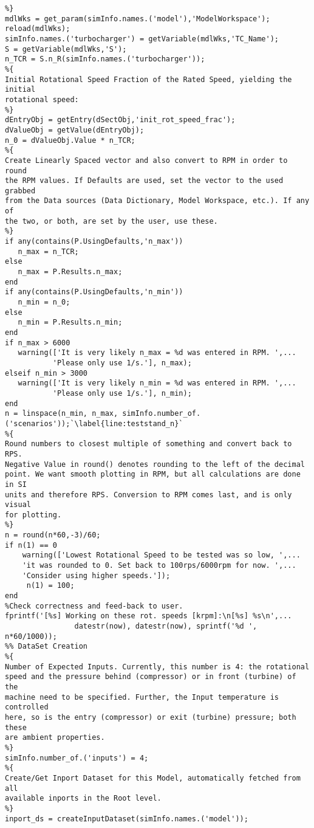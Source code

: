 \begin{lstlisting}
%}
mdlWks = get_param(simInfo.names.('model'),'ModelWorkspace');
reload(mdlWks);
simInfo.names.('turbocharger') = getVariable(mdlWks,'TC_Name');
S = getVariable(mdlWks,'S');
n_TCR = S.n_R(simInfo.names.('turbocharger'));
%{
Initial Rotational Speed Fraction of the Rated Speed, yielding the initial
rotational speed:
%}
dEntryObj = getEntry(dSectObj,'init_rot_speed_frac');
dValueObj = getValue(dEntryObj);
n_0 = dValueObj.Value * n_TCR;
%{
Create Linearly Spaced vector and also convert to RPM in order to round
the RPM values. If Defaults are used, set the vector to the used grabbed
from the Data sources (Data Dictionary, Model Workspace, etc.). If any of
the two, or both, are set by the user, use these.
%}
if any(contains(P.UsingDefaults,'n_max'))
   n_max = n_TCR;
else
   n_max = P.Results.n_max;
end
if any(contains(P.UsingDefaults,'n_min'))
   n_min = n_0;
else
   n_min = P.Results.n_min;
end
if n_max > 6000
   warning(['It is very likely n_max = %d was entered in RPM. ',...
           'Please only use 1/s.'], n_max);
elseif n_min > 3000
   warning(['It is very likely n_min = %d was entered in RPM. ',...
           'Please only use 1/s.'], n_min);
end
n = linspace(n_min, n_max, simInfo.number_of.('scenarios'));`\label{line:teststand_n}`
%{
Round numbers to closest multiple of something and convert back to RPS.
Negative Value in round() denotes rounding to the left of the decimal
point. We want smooth plotting in RPM, but all calculations are done in SI
units and therefore RPS. Conversion to RPM comes last, and is only visual
for plotting.
%}
n = round(n*60,-3)/60;
if n(1) == 0
    warning(['Lowest Rotational Speed to be tested was so low, ',...
    'it was rounded to 0. Set back to 100rps/6000rpm for now. ',...
    'Consider using higher speeds.']);
     n(1) = 100;
end
%Check correctness and feed-back to user.
fprintf('[%s] Working on these rot. speeds [krpm]:\n[%s] %s\n',...
                datestr(now), datestr(now), sprintf('%d ', n*60/1000));
%% DataSet Creation
%{
Number of Expected Inputs. Currently, this number is 4: the rotational
speed and the pressure behind (compressor) or in front (turbine) of the
machine need to be specified. Further, the Input temperature is controlled
here, so is the entry (compressor) or exit (turbine) pressure; both these
are ambient properties.
%}
simInfo.number_of.('inputs') = 4;
%{
Create/Get Inport Dataset for this Model, automatically fetched from all
available inports in the Root level.
%}
inport_ds = createInputDataset(simInfo.names.('model'));


\end{lstlisting}
